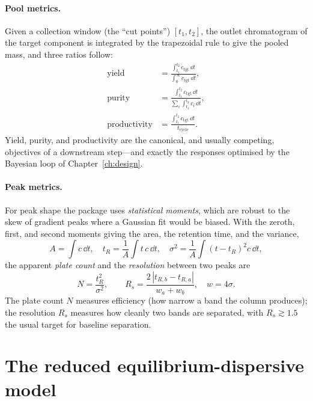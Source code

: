 \paragraph{Pool metrics.}
Given a collection window (the ``cut points'') $[t_1,t_2]$, the outlet
chromatogram of the target component is integrated by the trapezoidal rule to
give the pooled mass, and three ratios follow:
%
\begin{align}
\text{yield} &= \frac{\int_{t_1}^{t_2} c_{\mathrm{tgt}}\,\dd t}
                      {\int_{0}^{\infty} c_{\mathrm{tgt}}\,\dd t}, \\[0.3em]
\text{purity} &= \frac{\int_{t_1}^{t_2} c_{\mathrm{tgt}}\,\dd t}
                      {\sum_i \int_{t_1}^{t_2} c_i\,\dd t}, \\[0.3em]
\text{productivity} &= \frac{\int_{t_1}^{t_2} c_{\mathrm{tgt}}\,\dd t}
                            {t_{\mathrm{cycle}}}.
\end{align}
%
Yield, purity, and productivity are the canonical, and usually competing,
objectives of a downstream step---and exactly the responses optimised by the
Bayesian loop of Chapter~\ref{ch:design}.

\paragraph{Peak metrics.}
For peak shape the package uses \emph{statistical moments}, which are robust to
the skew of gradient peaks where a Gaussian fit would be biased. With the
zeroth, first, and second moments giving the area, the retention time, and the
variance,
%
\begin{equation}
A = \!\int\! c\,\dd t, \quad
t_R = \frac{1}{A}\!\int\! t\,c\,\dd t, \quad
\sigma^2 = \frac{1}{A}\!\int\! (t-t_R)^2 c\,\dd t,
\end{equation}
%
the apparent \emph{plate count} and the \emph{resolution} between two peaks are
%
\begin{equation}
N = \frac{t_R^2}{\sigma^2}, \qquad
R_s = \frac{2\,|t_{R,b}-t_{R,a}|}{w_a + w_b}, \quad w = 4\sigma.
\label{eq:plates}
\end{equation}
%
The plate count $N$ measures efficiency (how narrow a band the column produces);
the resolution $R_s$ measures how cleanly two bands are separated, with
$R_s\gtrsim 1.5$ the usual target for baseline separation.

\section{The reduced equilibrium-dispersive model}
\label{sec:legacy}

